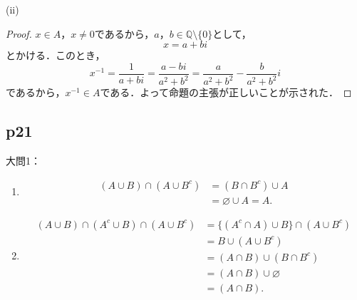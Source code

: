 \documentclass[dvipdfmx,uplatex,11pt]{jsarticle}
\begin{document}
(ii)
\begin{leftbar}
    \begin{proof}
        $x \in A$，$x \ne 0$であるから，$a，b \in \mathbb{Q} \setminus \{0\}$として，
        \[
            x=a+bi
        \]
        とかける．このとき，
        \[
        x^{-1}=\frac{1}{a+bi}=\frac{a-bi}{a^2+b^2} = \frac{a}{a^2+b^2} - \frac{b}{a^2+b^2} i
        \]
        であるから，$x^{-1} \in A$である．よって命題の主張が正しいことが示された．
    \end{proof}
\end{leftbar}
\subsection{p21}
大問1：
\begin{leftbar}
    \begin{enumerate}[(1)]
        \item \begin{align*}
        (A \cup B) \cap (A \cup B^c) & = (B \cap B^c) \cup A \\
        & = \varnothing \cup A = A.
        \end{align*}
        \item \begin{align*}
        (A \cup B) \cap (A^c \cup B) \cap (A \cup B^c) & = \{ (A^c \cap A) \cup B \} \cap (A \cup B^c) \\
        & = B \cup (A \cup B^c) \\
        & = (A \cap B) \cup (B \cap B^c) \\
        & = (A \cap B) \cup \varnothing \\
        & = (A \cap B).
        \end{align*}
        \end{enumerate}
    \end{leftbar}
\end{document}
